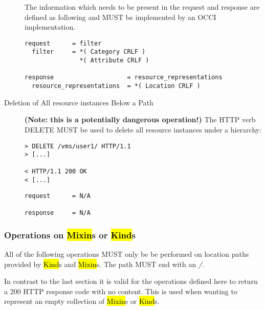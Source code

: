 \documentclass[10pt,a4paper]{article}
\begin{document}
\begin{description}
    The information which needs to be present in the request and
    response are defined as following and MUST be implemented by an
    OCCI implementation.

\begin{verbatim}
request      = filter
  filter     = *( Category CRLF )
               *( Attribute CRLF )

response                    = resource_representations
  resource_representations  = *( Location CRLF ) 
\end{verbatim}

  \item[Deletion of All resource instances Below a Path]
    \textbf{(Note: this is a potentially dangerous operation!)} The
    HTTP verb DELETE MUST be used to delete all resource instances
    under a hierarchy:
\begin{verbatim}
> DELETE /vms/user1/ HTTP/1.1
> [...]
 
< HTTP/1.1 200 OK
< [...]
\end{verbatim}

\begin{verbatim}
request      = N/A

response     = N/A
\end{verbatim}

\end{description}

\subsubsection{Operations on \hl{Mixin}s or \hl{Kind}s}
\label{sec:mixin_and_kind_operations}
All of the following operations MUST only be be performed on location
paths provided by \hl{Kind}s and \hl{Mixin}s. The path MUST end with
an \emph{/}.

In contrast to the last section it is valid for the operations defined
here to return a 200 HTTP response code with no content. This is used
when wanting to represent an empty collection of \hl{Mixin}s or
\hl{Kind}s.
\end{document}
